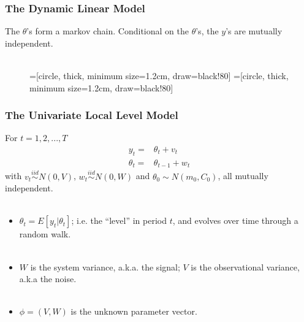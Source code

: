 \documentclass[xcolor=dvipsnames]{beamer}\usepackage{graphicx, color}
\begin{document}
\begin{frame}[fragile]
  \frametitle{The Dynamic Linear Model} 
  The $\theta$'s form a markov chain. Conditional on the $\theta$'s, the $y$'s are mutually independent.\\~\\
\begin{figure}
  \centering
    =[circle, thick, minimum size=1.2cm, draw=black!80]
    =[circle, thick, minimum size=1.2cm, draw=black!80]
  \end{figure}
\end{frame}

\begin{frame}
 \frametitle{The Univariate Local Level Model}
For $t=1,2,...,T$
\begin{align*}
    y_t  =&\theta_t +  v_t\\
    \theta_t =& \theta_{t-1} + w_t
  \end{align*} 
  with $v_t\stackrel{iid}{\sim}N(0,V)$, $w_t\stackrel{iid}{\sim}N(0,W)$ and $\theta_0\sim N(m_0,C_0)$, all mutually independent.\pause\\~\\
  \begin{itemize}%
  \item $\theta_t=E[y_t|\theta_t]$; i.e. the ``level'' in period $t$, and evolves over time through a random walk.\pause\\~\\
  \item $W$ is the system variance, a.k.a. the signal; $V$ is the observational variance, a.k.a the noise.\\~\\
  \item $\phi=(V,W)$ is the unknown parameter vector.
  \end{itemize}
\end{frame}
\end{document}
